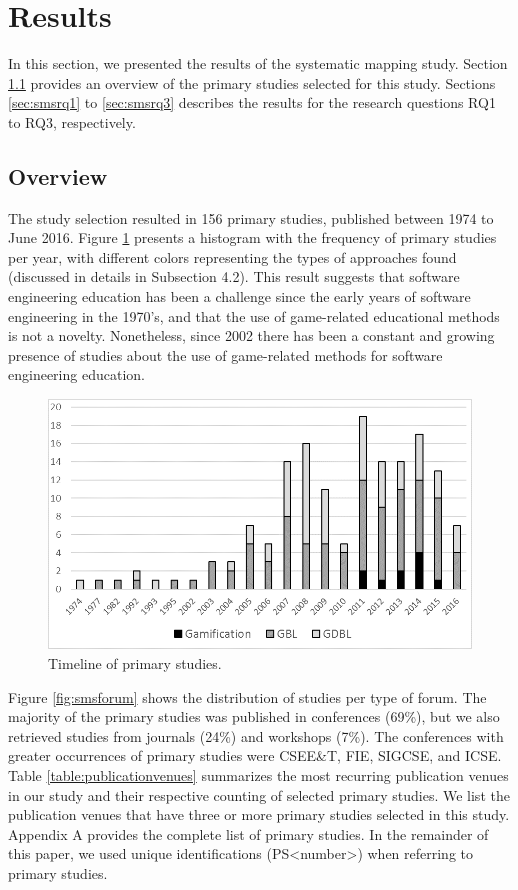 \section{Results}
\label{sec:smsresults}

In this section, we presented the results of the systematic mapping study. Section \ref{sec:smsresultoverview} provides an overview of the primary studies selected for this study. Sections \ref{sec:smsrq1} to \ref{sec:smsrq3} describes the results for the research questions RQ1 to RQ3, respectively.

\subsection{Overview}
\label{sec:smsresultoverview}

The study selection resulted in 156 primary studies, published between 1974 to June 2016. Figure \ref{fig:smstimeline} presents a histogram with the frequency of primary studies per year, with different colors representing the types of approaches found (discussed in details in Subsection 4.2). This result suggests that software engineering education has been a challenge since the early years of software engineering in the 1970’s, and that the use of game-related educational methods is not a novelty. Nonetheless, since 2002 there has been a constant and growing presence of studies about the use of game-related methods for software engineering education.

\begin{figure}[!h]%
\centering
\includegraphics{img/smsTimeline.png}
\caption{Timeline of primary studies.}
\label{fig:smstimeline}
\end{figure} 

Figure \ref{fig:smsforum} shows the distribution of studies per type of forum. The majority of the primary studies was published in conferences (69\%), but we also retrieved studies from journals (24\%) and workshops (7\%). The conferences with greater occurrences of primary studies were CSEE&T, FIE, SIGCSE, and ICSE. Table \ref{table:publicationvenues} summarizes the most recurring publication venues in our study and their respective counting of selected primary studies. We list the publication venues that have three or more primary studies selected in this study. Appendix A provides the complete list of primary studies. In the remainder of this paper, we used unique identifications (PS<number>) when referring to primary studies.

